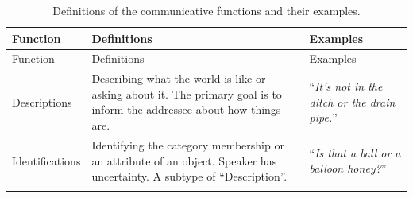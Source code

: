 \documentclass[,man,floatsintext]{apa6}
\begin{document}
\begin{longtable}[]{@{}lll@{}}
\caption{\label{tab:speechActs} Definitions of the communicative functions and their examples.}\tabularnewline
\toprule
\begin{minipage}[b]{0.13\columnwidth}\raggedright
Function\strut
\end{minipage} & \begin{minipage}[b]{0.45\columnwidth}\raggedright
Definitions\strut
\end{minipage} & \begin{minipage}[b]{0.33\columnwidth}\raggedright
Examples\strut
\end{minipage}\tabularnewline
\midrule
\endfirsthead
\toprule
\begin{minipage}[b]{0.13\columnwidth}\raggedright
Function\strut
\end{minipage} & \begin{minipage}[b]{0.45\columnwidth}\raggedright
Definitions\strut
\end{minipage} & \begin{minipage}[b]{0.33\columnwidth}\raggedright
Examples\strut
\end{minipage}\tabularnewline
\midrule
\endhead
\begin{minipage}[t]{0.13\columnwidth}\raggedright
Descriptions\strut
\end{minipage} & \begin{minipage}[t]{0.45\columnwidth}\raggedright
Describing what the world is like or asking about it. The primary goal is to inform the addressee about how things are.\strut
\end{minipage} & \begin{minipage}[t]{0.33\columnwidth}\raggedright
\enquote{\emph{It's not in the ditch or the drain pipe.}}\strut
\end{minipage}\tabularnewline
\begin{minipage}[t]{0.13\columnwidth}\raggedright
Identifications\strut
\end{minipage} & \begin{minipage}[t]{0.45\columnwidth}\raggedright
Identifying the category membership or an attribute of an object. Speaker has uncertainty. A subtype of \enquote{Description}.\strut
\end{minipage} & \begin{minipage}[t]{0.33\columnwidth}\raggedright
\enquote{\emph{Is that a ball or a balloon honey?}}\strut
\end{minipage}\tabularnewline
\begin{minipage}[t]{0.13\columnwidth}\raggedright

\end{minipage}
\end{longtable}
\end{document}
